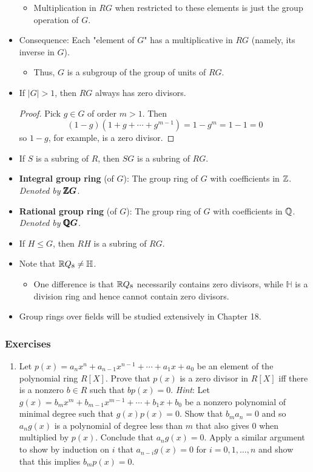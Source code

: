 \documentclass[../notes.tex]{subfiles}
\begin{document}
\begin{itemize}
    \begin{itemize}
        \item Multiplication in $RG$ when restricted to these elements is just the group operation of $G$.
    \end{itemize}
    \item Consequence: Each "element of $G$" has a multiplicative in $RG$ (namely, its inverse in $G$).
    \begin{itemize}
        \item Thus, $G$ is a subgroup of the group of units of $RG$.
    \end{itemize}
    \item If $|G|>1$, then $RG$ always has zero divisors.
    \begin{proof}
        Pick $g\in G$ of order $m>1$. Then
        \begin{equation*}
            (1-g)(1+g+\cdots+g^{m-1}) = 1-g^m
            = 1-1
            = 0
        \end{equation*}
        so $1-g$, for example, is a zero divisor.
    \end{proof}
    \item If $S$ is a subring of $R$, then $SG$ is a subring of $RG$.
    \item \textbf{Integral group ring} (of $G$): The group ring of $G$ with coefficients in $\mathbb{Z}$. \emph{Denoted by} $\bm{\pmb{\mathbb{Z}}G}$.
    \item \textbf{Rational group ring} (of $G$): The group ring of $G$ with coefficients in $\mathbb{Q}$. \emph{Denoted by} $\bm{\pmb{\mathbb{Q}}G}$.
    \item If $H\leq G$, then $RH$ is a subring of $RG$.
    \item Note that $\mathbb{R} Q_8\neq\mathbb{H}$.
    \begin{itemize}
        \item One difference is that $\mathbb{R} Q_8$ necessarily contains zero divisors, while $\mathbb{H}$ is a division ring and hence cannot contain zero divisors.
    \end{itemize}
    \item Group rings over fields will be studied extensively in Chapter 18.
\end{itemize}

\subsubsection*{Exercises}
\begin{enumerate}[label={\textbf{\arabic*.}},ref={7.2.\arabic*}]
    \item \label{exr:7.2.2}Let $p(x)=a_nx^n+a_{n-1}x^{n-1}+\cdots+a_1x+a_0$ be an element of the polynomial ring $R[X]$. Prove that $p(x)$ is a zero divisor in $R[X]$ iff there is a nonzero $b\in R$ such that $bp(x)=0$. \emph{Hint}: Let $g(x)=b_mx^m+b_{m-1}x^{m-1}+\cdots+b_1x+b_0$ be a nonzero polynomial of minimal degree such that $g(x)p(x)=0$. Show that $b_ma_n=0$ and so $a_ng(x)$ is a polynomial of degree less than $m$ that also gives 0 when multiplied by $p(x)$. Conclude that $a_ng(x)=0$. Apply a similar argument to show by induction on $i$ that $a_{n-i}g(x)=0$ for $i=0,1,\dots,n$ and show that this implies $b_mp(x)=0$.
\end{enumerate}
\end{document}
